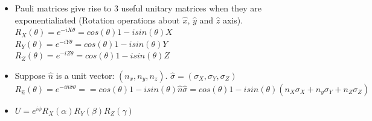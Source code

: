 \documentclass[11.5pt, paper=a4]{article}
\theoremstyle{definition}
\numberwithin{theorem}{section}
\begin{document}
\begin{itemize}
    \item Pauli matrices give rise to 3 useful unitary matrices when they are exponentialiated (Rotation operations about $\hat{x}$, $\hat{y}$ and $\hat{z}$ axis).\\
        $R_{X}(\theta) = e^{-iX\theta} = cos(\theta)1 - i sin(\theta) X$ \\
        $R_{Y}(\theta) = e^{-iY\theta} = cos(\theta)1 - i sin(\theta) Y$\\
        $R_{Z}(\theta) = e^{-iZ\theta} = cos(\theta)1 - i sin(\theta) Z$ \\
    \newpage

    \item Suppose $\hat{n}$ is a unit vector: $(n_{x}, n_{y}, n_{z})$.   $\hat{\sigma} = (\sigma_{X}, \sigma_{Y}, \sigma_{Z})$\\
    $R_{\hat{n}}(\theta) = e^{-i\hat{n}\hat{\sigma}\theta} = = cos(\theta)1 - i sin(\theta) \hat{n} \hat{\sigma} = cos(\theta)1 - i sin(\theta)(n_{X}\sigma_{X} + n_{y}\sigma_{Y} + n_{Z}\sigma_{Z})$

    \item $U = e^{i\phi}R_{X}(\alpha)R_{Y}(\beta)R_{Z}(\gamma)$


\end{itemize}
\end{document}
